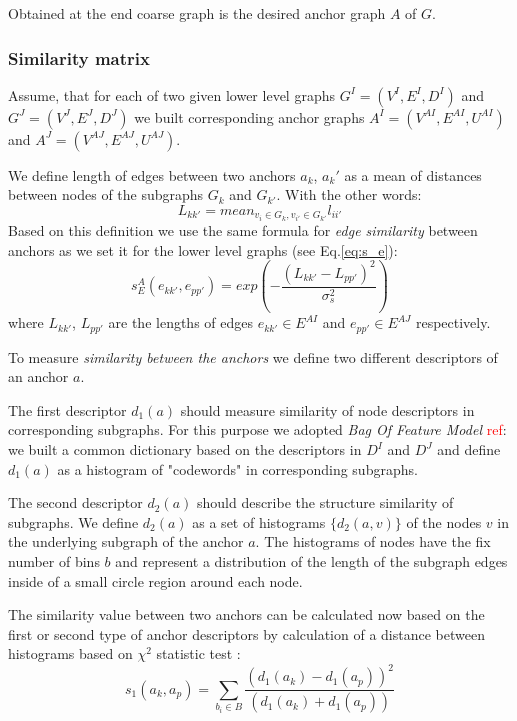 \documentclass[
	fontsize=12pt,
	paper=a4,
	twoside=false,
	numbers=noenddot,
	plainheadsepline,
	toc=listof,
	toc=bibliography
]{scrartcl}
\newcommand\ToDo[1]{\textcolor{red}{#1}}
\begin{document}
Obtained at the end coarse graph is the desired anchor graph $A$ of $G$. 

\subsubsection{Similarity matrix}

Assume, that for each of two given lower level graphs $G^I = (V^I, E^I, D^I)$ and $G^J=(V^J, E^J, D^J)$ we built corresponding anchor graphs  $A^I=(V^{AI},E^{AI}, U^{AI})$ and $A^J=(V^{AJ},E^{AJ},U^{AJ})$. 

We define length of edges between two anchors $a_k$, $a_k\prime$ as a mean of distances between nodes of the subgraphs $G_k$ and $G_{k\prime}$. With the other words:
\begin{equation} L_{kk\prime} = mean_{v_i\in G_k, v_{i\prime}\in G_{k\prime}} l_{ii\prime} \end{equation}
Based on this definition we use the same formula for \emph{edge similarity} between anchors as we set it for the lower level graphs (see Eq.\ref{eq:s_e}):
\begin{equation} 
s^A_E(e_{kk\prime}, e_{pp\prime}) = exp(-\frac{(L_{kk\prime} - L_{pp\prime})^2}{\sigma^2_{s}})
\label{eq:s_e_A}
\end{equation}
where $L_{kk\prime}$, $L_{pp\prime} $ are the lengths of edges $e_{kk\prime}\in E^{AI}$ and $e_{pp\prime}\in E^{AJ}$ respectively.

To measure \emph{similarity between the anchors} we  define two different descriptors of an anchor $a$.

The first descriptor $d_1(a)$ should measure similarity of node descriptors in corresponding subgraphs. For this purpose we adopted \emph{Bag Of Feature Model} \ToDo{ref}: we built a common dictionary based on the descriptors in $D^I$ and $D^J$ and define $d_1(a)$ as a histogram of "codewords" in corresponding subgraphs.

The second descriptor $d_2(a)$ should describe the structure similarity of subgraphs. We define $d_2(a)$ as a set of histograms $\{d_2(a,v)\}$ of the nodes $v$ in the underlying subgraph of the anchor $a$. The histograms of nodes have the fix number of bins $b$ and represent a distribution of the length of the subgraph edges inside of a small circle region around each node. 

The similarity value between two anchors can be calculated now based on the first or second type of anchor descriptors by calculation of a distance between histograms based on $\chi^2$ statistic test \cite{Weken2004_ChiSqTest}:
\begin{equation}
s_1(a_k, a_p) = \sum_{b_i\in B}\frac{(d_1(a_k)-d_1(a_p))^2}{(d_1(a_k)+d_1(a_p))}
\end{equation}
\end{document}
